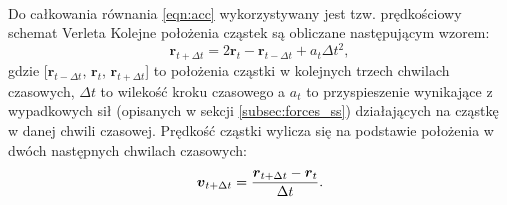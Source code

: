 \paragraph{}
Do całkowania równania \eqref{eqn:acc} wykorzystywany jest tzw. prędkościowy schemat Verleta \cite{wiki:2} Kolejne położenia cząstek są obliczane następującym wzorem:
\begin{equation}
\boldsymbol{r}_{t+\Delta t} = 2\boldsymbol{r}_t - \boldsymbol{r}_{t-\Delta t} + a_t\Delta t^2,
\label{eqn:verlet_pos_int}
\end{equation}
gdzie [$\boldsymbol{r}_{t-\Delta t}$, $\boldsymbol{r}_{t}$, $\boldsymbol{r}_{t+\Delta t}$] to położenia cząstki w kolejnych trzech chwilach czasowych, ${\Delta t}$ to wilekość kroku czasowego a $a_t$ to przyspieszenie wynikające z wypadkowych sił (opisanych w sekcji \eqref{subsec:forces_ss}) działających na cząstkę w danej chwili czasowej. Prędkość cząstki wylicza się na podstawie położenia w dwóch następnych chwilach czasowych:
\begin{equation}
\boldsymbol{v}_{t+\Delta t} = {\boldsymbol{r}_{t+\Delta t} - \boldsymbol{r}_{t} \over \Delta t}.
\label{eqn:verlet_vel_int}
\end{equation}
\par
